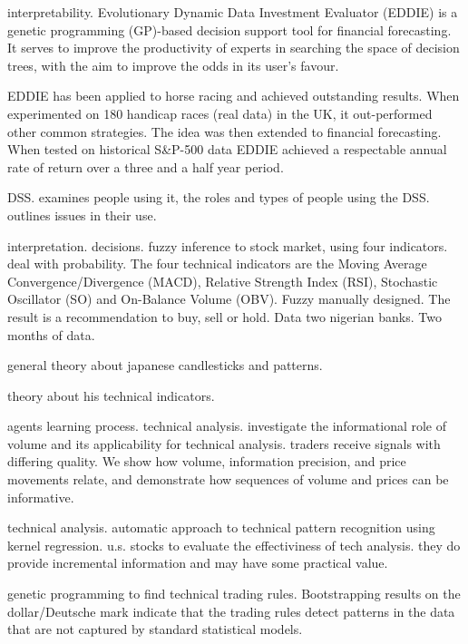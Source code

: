 \cite{Tsang2004} interpretability. Evolutionary Dynamic Data Investment
Evaluator (EDDIE) is a genetic programming (GP)-based decision support tool for
financial forecasting. It serves to improve the productivity of experts in
searching the space of decision trees, with the aim to improve the odds in its user’s favour.

\cite{tsang1998eddie} EDDIE has been applied to horse racing and achieved outstanding
results. When experimented on 180 handicap races (real data) in the UK, it
out-performed other common strategies. The idea was then extended to financial forecasting. When tested on
historical S&P-500 data EDDIE achieved a respectable annual rate of return over
a three and a half year period.

\cite{Sprague1980} DSS. examines people using it, the roles and types of people using the
DSS. outlines issues in their use.

\cite{Ijegwa2014} interpretation. decisions. fuzzy inference to stock market, using four
indicators. deal with probability. The four technical indicators are the
Moving Average Convergence/Divergence (MACD), Relative Strength Index (RSI),
Stochastic Oscillator (SO) and On-Balance Volume (OBV). Fuzzy manually
designed. The result is a recommendation to buy, sell or hold. Data two nigerian
banks. Two months of data.

\cite{Nison1991} general theory about japanese candlesticks and patterns.

\cite{Wilder1978} theory about his technical indicators.

\cite{Blume1994} agents learning process. technical analysis. investigate the informational role
of volume and its applicability for technical analysis. traders receive signals
with differing quality. We show how volume, information precision, and price
movements relate, and demonstrate how sequences of volume and prices can be
informative.

\cite{Lo2000} technical analysis. automatic approach to technical pattern recognition using
kernel regression. u.s. stocks to evaluate the effectiviness of tech
analysis. they do provide incremental information and may have some practical value.

\cite{Neely1997} genetic programming to find technical trading rules. Bootstrapping
results on the dollar/Deutsche mark indicate that the trading rules detect
patterns in the data that are not captured by standard statistical models.

